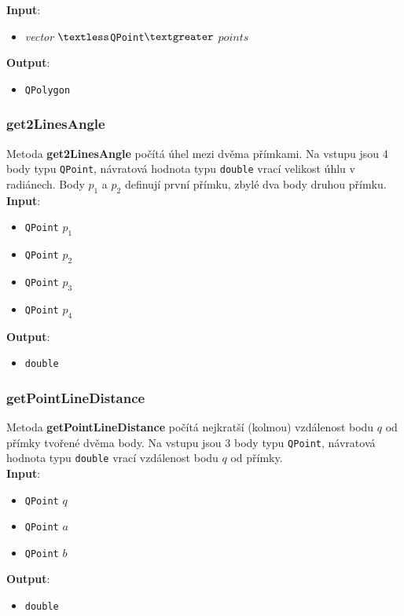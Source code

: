 \documentclass[a4paper, 12pt]{article}
\begin{document}
\textbf{Input}:
\begin{itemize}
\item \textsl{vector} $\textless$\texttt{QPoint}$\textgreater$ $points$
\end{itemize}

\textbf{Output}:
\begin{itemize}
\item \texttt{QPolygon}
\end{itemize}

\subsubsection*{get2LinesAngle}
Metoda \textbf{get2LinesAngle} počítá úhel mezi dvěma přímkami. Na vstupu jsou 4 body typu \texttt{QPoint}, návratová hodnota typu \texttt{double} vrací velikost úhlu v radiánech. Body $p_1$ a $p_2$ definují první přímku, zbylé dva body druhou přímku.\\

\textbf{Input}:
\begin{itemize}
\item \texttt{QPoint} $p_1$ 
\item \texttt{QPoint} $p_2$ 
\item \texttt{QPoint} $p_3$
\item \texttt{QPoint} $p_4$
\end{itemize}

\textbf{Output}:
\begin{itemize}
\item \texttt{double} 
\end{itemize}

\subsubsection*{getPointLineDistance}
Metoda \textbf{getPointLineDistance} počítá nejkratší (kolmou) vzdálenost bodu $q$ od přímky tvořené dvěma body. Na vstupu jsou 3 body typu \texttt{QPoint}, návratová hodnota typu \texttt{double} vrací vzdálenost bodu $q$ od přímky.\\ 

\textbf{Input}:
\begin{itemize}
\item \texttt{QPoint} $q$ 
\item \texttt{QPoint} $a$ 
\item \texttt{QPoint} $b$
\end{itemize}

\textbf{Output}:
\begin{itemize}
\item \texttt{double} 
\end{itemize}
\end{document}
